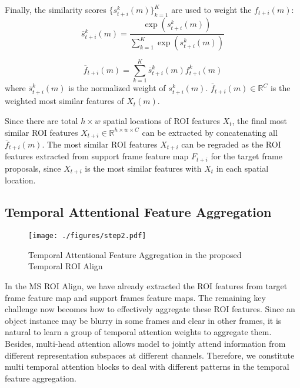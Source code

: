 \documentclass[letterpaper]{article} \usepackage{aaai21}  \usepackage{times}  \usepackage{helvet} \usepackage{courier}  \usepackage[hyphens]{url}  \usepackage{graphicx} \usepackage{hyperref}
\begin{document}
Finally, the similarity scores $\{s_{t+i}^k(m)\}_{k=1}^{K}$ are used to weight the $f_{t+i}(m)$:
\begin{equation}
\overline{s}_{t+i}^k(m) = \frac{\exp(s_{t+i}^k(m))}{\textstyle\sum_{k=1}^{K}\exp(s_{t+i}^k(m))}
\end{equation}

\begin{equation}
\overline{f}_{t+i}(m) = \textstyle\sum_{k=1}^{K}\overline{s}_{t+i}^k(m)f_{t+i}^k(m)
\end{equation}
where $\overline{s}_{t+i}^k(m)$ is the normalized weight of $s_{t+i}^k(m)$. $\overline{f}_{t+i}(m)\in\mathbb{R}^{C}$ is the weighted most similar features of $X_t(m)$.

Since there are total $h\times w$ spatial locations of ROI features $X_t$, the final most similar ROI features $X_{t+i}\in\mathbb{R}^{h\times w\times C}$ can be extracted by concatenating all $\overline{f}_{t+i}(m)$.
The most similar ROI features $X_{t+i}$ can be regraded as the ROI features extracted from support frame feature map $F_{t+i}$ for the target frame proposals, since $X_{t+i}$ is the most similar features with $X_t$ in each spatial location.

\subsection{Temporal Attentional Feature Aggregation}
\begin{figure}[t]
\centering
\texttt{[image: ./figures/step2.pdf]}
\caption{Temporal Attentional Feature Aggregation in the proposed Temporal ROI Align}
\label{fig:step2}
\vspace{-0.05cm}
\end{figure}

In the MS ROI Align, we have already extracted the ROI features from target frame feature map and support frames feature maps. The remaining key challenge now becomes how to effectively aggregate these ROI features. 
Since an object instance may be blurry in some frames and clear in other frames, it is natural to learn a group of temporal attention weights to aggregate them.
Besides, multi-head attention \cite{vaswani2017attention} allows model to jointly attend information from different representation subspaces at different channels. Therefore, we constitute multi temporal attention blocks to deal with different patterns in the temporal feature aggregation.
\end{document}
